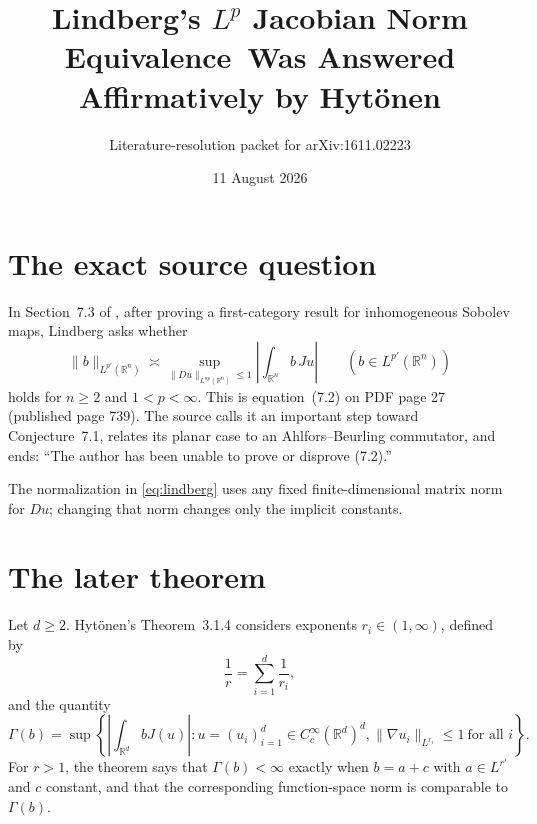 \documentclass[11pt]{article}
\title{Lindberg's $L^p$ Jacobian Norm Equivalence\
Was Answered Affirmatively by Hyt\"onen}
\author{Literature-resolution packet for arXiv:1611.02223}
\date{11 August 2026}
\newcommand{\R}{\mathbb R}
\newcommand{\norm}[1]{\lVert #1\rVert}
\begin{document}
\maketitle

\begin{center}
\end{center}

\section{The exact source question}

In Section~7.3 of \cite{Lindberg}, after proving a first-category result for
inhomogeneous Sobolev maps, Lindberg asks whether
\begin{equation}\label{eq:lindberg}
 \norm{b}_{L^{p'}(\R^n)}
 \asymp
 \sup_{\norm{Du}_{L^{np}(\R^n)}\le1}
 \left|\int_{\R^n} b\,Ju\right|
 \qquad (b\in L^{p'}(\R^n))
\end{equation}
holds for $n\ge2$ and $1<p<\infty$.  This is equation~(7.2) on PDF page 27
(published page 739).  The source calls it an important step toward
Conjecture~7.1, relates its planar case to an Ahlfors--Beurling commutator,
and ends: ``The author has been unable to prove or disprove (7.2).''

The normalization in \eqref{eq:lindberg} uses any fixed finite-dimensional
matrix norm for $Du$; changing that norm changes only the implicit constants.

\section{The later theorem}

Let $d\ge2$.  Hyt\"onen's Theorem~3.1.4 \cite{Hytonen} considers exponents
$r_i\in(1,\infty)$, defined by
\[
 \frac1r=\sum_{i=1}^d\frac1{r_i},
\]
and the quantity
\begin{equation}\label{eq:hytonen}
 \Gamma(b)=
 \sup\left\{
  \left|\int_{\R^d}bJ(u)\right|:
  u=(u_i)_{i=1}^d\in C_c^\infty(\R^d)^d,
  \norm{\nabla u_i}_{L^{r_i}}\le1\ \text{for all }i
 \right\}.
\end{equation}
For $r>1$, the theorem says that $\Gamma(b)<\infty$ exactly when
$b=a+c$ with $a\in L^{r'}$ and $c$ constant, and that the corresponding
function-space norm is comparable to $\Gamma(b)$.
\end{document}
